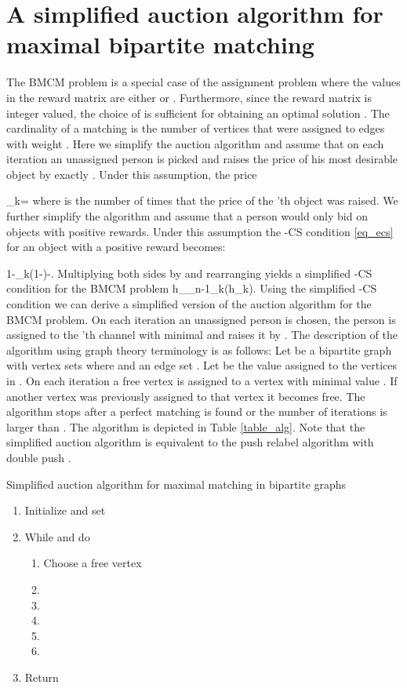 \documentclass[11pt,onecolumn]{article}
\newcommand{\beq}{}
\begin{document}
\section{A simplified auction algorithm for maximal bipartite matching}
The BMCM problem is a special case of the assignment problem where the values in the reward matrix are either  or . Furthermore, since the reward matrix is integer valued, the choice of  is sufficient for obtaining an optimal solution \cite{bertsekas1979distributed}. The cardinality of a matching is the number of vertices that were assigned to edges with weight .
Here we simplify the auction algorithm and assume that on each iteration an unassigned person is picked and raises the price of his most desirable object by exactly .  Under this assumption, the price
\beq
\rho_k=
\eeq
where  is the number of times that the price of the 'th object was raised.
We further simplify the algorithm and assume that a person would only bid on objects with positive rewards.
Under this assumption the -CS condition \ref{eq_ecs} for an object with a positive reward becomes:
\beq
1-\geq\max_k(1-)-.
\eeq
Multiplying both sides by  and rearranging yields a simplified -CS condition for the BMCM problem
\beq\label{eq_ecs_bipart}
h_{\eta_n}-1\leq\min_k(h_k).
\eeq
Using the simplified -CS condition we can derive a simplified version of the auction algorithm for the BMCM problem.
On each iteration an unassigned person is chosen, the person is assigned to the 'th channel with minimal  and raises it by .
The description of the algorithm using graph theory terminology is as follows:
Let  be a bipartite graph with vertex sets  where  and an edge set . Let  be the value assigned to the vertices in . On each iteration a free vertex  is  assigned to a vertex  with minimal value . If another vertex was previously assigned to that vertex it becomes free. The algorithm stops after a perfect matching is found or the number of iterations is larger than .
The algorithm is depicted in Table \ref{table_alg}. Note that the simplified auction algorithm is equivalent to the push relabel algorithm with double push \cite{goldberg1995efficient}.
\begin{table}
\label{table_alg}
\caption{Simplified auction algorithm for maximal matching in bipartite graphs}
\begin{enumerate}
\item Initialize  and set 
\item While  and  do
\begin{enumerate}
\item Choose a free vertex 
\item 
\item 
\item 
\item 
\item 
\end{enumerate}
\item Return
\end{enumerate}

\end{table}
\end{document}
